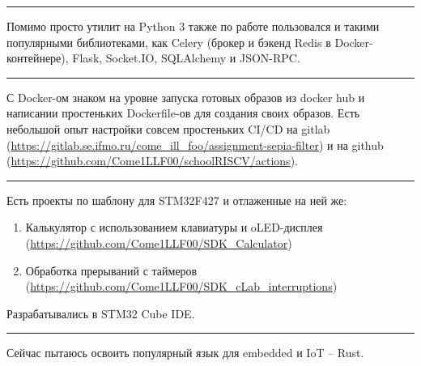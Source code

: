 \documentclass[10pt, final, twoside]{article}
\begin{document}
\par\noindent\rule{\textwidth}{0.1pt}

Помимо просто утилит на Python 3 также по работе пользовался и такими популярными библиотеками, как Celery (брокер и бэкенд Redis в Docker-контейнере), Flask, Socket.IO, SQLAlchemy и JSON-RPC.

\par\noindent\rule{\textwidth}{0.1pt}

С Docker-ом знаком на уровне запуска готовых образов из docker hub и написании простеньких Dockerfile-ов для создания своих образов. Есть небольшой опыт настройки совсем простеньких CI/CD на gitlab (\url{https://gitlab.se.ifmo.ru/come_ill_foo/assignment-sepia-filter}) и на github (\url{https://github.com/Come1LLF00/schoolRISCV/actions}).

\par\noindent\rule{\textwidth}{0.1pt}

Есть проекты по шаблону для STM32F427 и отлаженные на ней же:
\begin{enumerate}
  \item Калькулятор с использованием клавиатуры и oLED-дисплея (\url{https://github.com/Come1LLF00/SDK_Calculator})
  \item Обработка прерываний с таймеров (\url{https://github.com/Come1LLF00/SDK_cLab_interruptions})
\end{enumerate}
Разрабатывались в STM32 Cube IDE.

\par\noindent\rule{\textwidth}{0.1pt}

Сейчас пытаюсь освоить популярный язык для embedded и IoT -- Rust.
\end{document}
